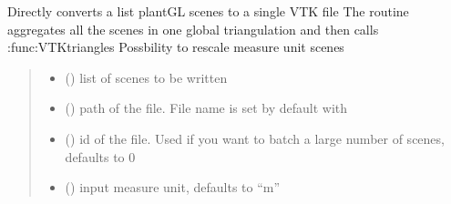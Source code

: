 \documentclass[letterpaper,10pt,english]{sphinxmanual}
\begin{document}

\begin{fulllineitems}
\label{\detokenize{reference:VTK.PlantGL_to_VTK}}
\pysigstartsignatures
{}
\pysigstopsignatures
\sphinxAtStartPar
Directly converts a list plantGL scenes to a single VTK file
The routine aggregates all the scenes in one global triangulation and then calls :func:VTKtriangles
Possbility to rescale measure unit scenes
\begin{quote}\begin{description}
\begin{itemize}
\item {} 
\sphinxAtStartPar
{} () \textendash{} list of scenes to be written

\item {} 
\sphinxAtStartPar
{} () \textendash{} path of the file. File name is set by default with 

\item {} 
\sphinxAtStartPar
{} (\sphinxstyleliteralemphasis{\sphinxupquote{, }}) \textendash{} id of the file. Used if you want to batch a large number of scenes, defaults to 0

\item {} 
\sphinxAtStartPar
{} (\sphinxstyleliteralemphasis{\sphinxupquote{, }}) \textendash{} input measure unit, defaults to “m”


\end{itemize}
\end{description}
\end{quote}
\end{fulllineitems}
\end{document}
